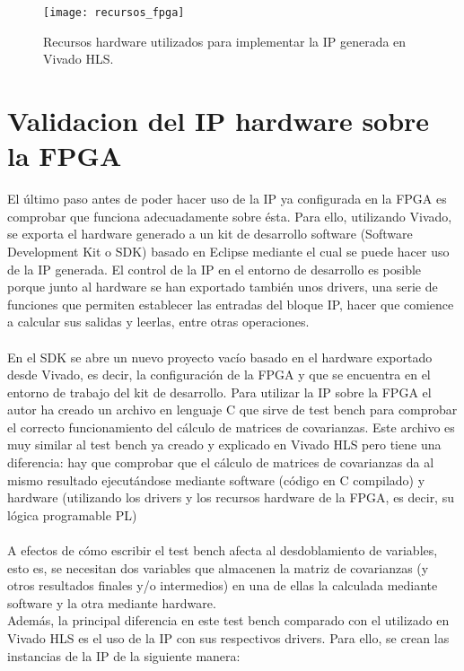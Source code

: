 \begin{figure}[!htb]
\centering
\texttt{[image: recursos\_fpga]}
\caption{Recursos hardware utilizados para implementar la IP generada en Vivado HLS.}\label{fig:recursos_fpga}
\end{figure}

\section{Validacion del IP hardware sobre la FPGA}
El último paso antes de poder hacer uso de la IP ya configurada en la FPGA es comprobar que funciona adecuadamente sobre ésta. Para ello, utilizando Vivado, se exporta el hardware generado a un kit de desarrollo software (Software Development Kit o SDK) basado en Eclipse mediante el cual se puede hacer uso de la IP generada. El control de la IP en el entorno de desarrollo es posible porque junto al hardware se han exportado también unos drivers, una serie de funciones que permiten establecer las entradas del bloque IP, hacer que comience a calcular sus salidas y leerlas, entre otras operaciones.
\\
\\
En el SDK se abre un nuevo proyecto vacío basado en el hardware exportado desde Vivado, es decir, la configuración de la FPGA y que se encuentra en el entorno de trabajo del kit de desarrollo. Para utilizar la IP sobre la FPGA el autor ha creado un archivo en lenguaje C que sirve de test bench para comprobar el correcto funcionamiento del cálculo de matrices de covarianzas. Este archivo es muy similar al test bench ya creado y explicado en Vivado HLS pero tiene una diferencia: hay que comprobar que el cálculo de matrices de covarianzas da al mismo resultado ejecutándose mediante software (código en C compilado) y hardware (utilizando los drivers y los recursos hardware de la FPGA, es decir, su lógica programable PL) 
\\
\\
A efectos de cómo escribir el test bench afecta al desdoblamiento de variables, esto es, se necesitan dos variables que almacenen la matriz de covarianzas (y otros resultados finales y/o intermedios) en una de ellas la calculada mediante software y la otra mediante hardware.
\\
Además, la principal diferencia en este test bench comparado con el utilizado en Vivado HLS es el uso de la IP con sus respectivos drivers. Para ello, se crean las instancias de la IP de la siguiente manera:

